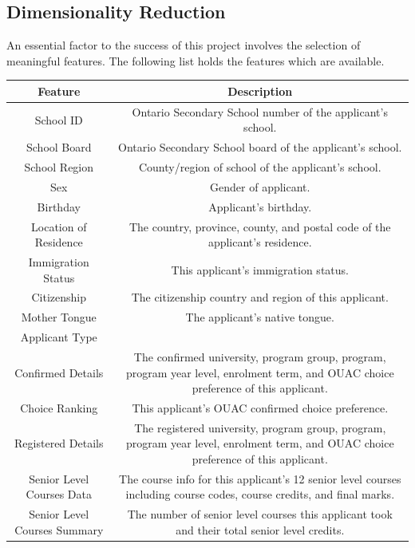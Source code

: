 \documentclass[titlepage]{article}
\begin{document}
\subsection{Dimensionality Reduction}
An essential factor to the success of this project involves the selection of meaningful features. The following list holds the features which are available.\\
\begin{table}[!htbp]
\centering
\begin{tabular}{| C{4} | C{10} |}\hline
	\textbf{Feature}				&\textbf{Description}\\\hline
	School ID						&Ontario Secondary School number of the applicant's school.\\\hline
	School Board					&Ontario Secondary School board of the applicant's school.\\\hline
	School Region					&County/region of school of the applicant's school.\\\hline
	Sex								&Gender of applicant.\\\hline
	Birthday						&Applicant's birthday.\\\hline
	Location of Residence			&The country, province, county, and postal code of the applicant's residence.\\\hline
	Immigration Status				&This applicant's immigration status.\\\hline
	Citizenship						&The citizenship country and region of this applicant.\\\hline
	Mother Tongue					&The applicant's native tongue.\\\hline
	Applicant Type					&\\\hline%
	Confirmed Details				&The confirmed university, program group, program, program year level, enrolment term, and OUAC choice preference of this applicant.\\\hline
	Choice Ranking					&This applicant's OUAC confirmed choice preference.\\\hline
	Registered Details				&The registered university, program group, program, program year level, enrolment term, and OUAC choice preference of this applicant.\\\hline
	Senior Level Courses Data		&The course info for this applicant's 12 senior level courses including course codes, course credits, and final marks.\\\hline
	Senior Level Courses Summary	&The number of senior level courses this applicant took and their total senior level credits.\\\hline

\end{tabular}
\end{table}
\end{document}
